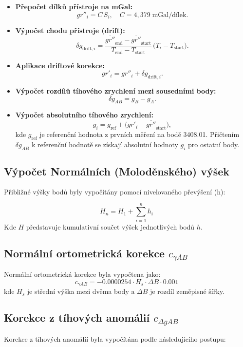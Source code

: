 \begin{itemize}
  \item \textbf{Přepočet dílků přístroje na mGal:}
    \[
      gr''_i = C\,S_i,
      \quad C = 4{,}379\;\text{mGal/dílek}.
    \]
  \item \textbf{Výpočet chodu přístroje (drift):}
    \[
      \delta g_{\mathrm{drift},i}
        = \frac{\overline{gr''}_{\mathrm{end}} - \overline{gr''}_{\mathrm{start}}}
               {T_{\mathrm{end}} - T_{\mathrm{start}}}
          \,\bigl(T_i - T_{\mathrm{start}}\bigr).
    \]
  \item \textbf{Aplikace driftové korekce:}
    \[
      gr'_i = gr''_i + \delta g_{\mathrm{drift},i}.
    \]
  \item \textbf{Výpočet rozdílů tíhového zrychlení mezi sousedními body:}
    \[
      \delta g_{AB} = g_B - g_A.
    \]
  \item \textbf{Výpočet absolutního tíhového zrychlení:}
    \[
      g_i = g_{\mathrm{ref}}
          + \bigl(gr'_i - \overline{gr''}_{\mathrm{start}}\bigr),
    \]
    kde \(g_{\mathrm{ref}}\) je referenční hodnota z prvních měření na bodě 3408.01. Přičtením \(\delta g_{AB}\) k referenční hodnotě se získají absolutní hodnoty \(g_i\) pro ostatní body.
\end{itemize}


\subsection{Výpočet Normálních (Moloděnského) výšek}

Přibližné výšky bodů byly vypočítány pomocí nivelovaného převýšení (h):

\[
H_n = H_1+\sum_{i=1}^n h_i
\]
Kde \( H \) představuje kumulativní součet výšek jednotlivých bodů \( h \).
\subsection*{Normální ortometrická korekce \( c_{\gamma AB} \)}
Normální ortometrická korekce byla vypočtena jako: 
\[
c_{\gamma AB} = -0.0000254 \cdot H_s \cdot \Delta B \cdot 0.001
\]
kde \(H_s\) je střední výška mezi dvěma body a \(\Delta B\) je rozdíl zeměpisné šířky.
\subsection*{Korekce z tíhových anomálií \( c_{\Delta g AB} \)}
Korekce z tíhových anomálií byla vypočítána podle následujícího postupu:

